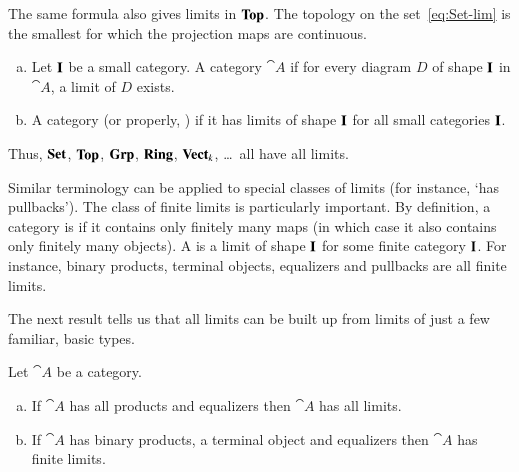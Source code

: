 \begin{example}
The same formula also gives limits in $\mathbf{Top}$.%
%
%
The topology on the set~\eqref{eq:Set-lim} is the smallest for which the
projection maps are continuous.
\end{example}

\begin{defn}
\label{defn:has-lims}
\begin{enumerate}[(b)]
\item
Let $\mathbf{I}$ be a small category.  A category $\cat{A}$  if for every diagram $D$ of shape $\mathbf{I}$ in
$\cat{A}$, a limit of $D$ exists.

\item
A category  (or properly, )
if it has limits of shape $\mathbf{I}$ for all small categories $\mathbf{I}$.
\end{enumerate}
\end{defn}

Thus, $\mathbf{Set}$, $\mathbf{Top}$, $\mathbf{Grp}$, $\mathbf{Ring}$, $\mathbf{Vect}_k$, \ldots\ all have all
limits.

Similar terminology can be applied to special classes of limits (for
instance, `has pullbacks').  The class of finite limits is particularly
important.  By definition, a category is %
%
%
if it contains only finitely many maps (in which case it also contains only
finitely many objects).  A  is a limit of shape $\mathbf{I}$ for some finite category $\mathbf{I}$.
For instance, binary products, terminal objects, equalizers and pullbacks
are all finite limits.

The next result tells us that all limits can be built up from limits of
just a few familiar, basic types.

\begin{propn}
\label{propn:lim-prod-eq}
%
%
Let $\cat{A}$ be a category.
%
\begin{enumerate}[(b)]
\item
\label{propn:lim-prod-eq:all}
If $\cat{A}$ has all products and equalizers then $\cat{A}$ has all limits.

\item
\label{propn:lim-prod-eq:fin}
If $\cat{A}$ has binary products, a terminal object and equalizers then
$\cat{A}$ has finite limits.
\end{enumerate}
\end{propn}

